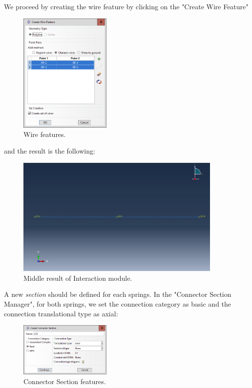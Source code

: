We proceed by creating the wire feature by clicking on the "Create Wire Feature" 
\begin{figure}[H]
    \centering
    \includegraphics[width=0.4\textwidth]{Images/ab1/a4.png}
    \caption{Wire features.}
    \label{fig:a4}
\end{figure}

and the result is the following:
\begin{figure}[H]
    \centering
    \includegraphics[width=0.9\textwidth]{Images/ab1/a5.png}
    \caption{Middle result of Interaction module.}
    \label{fig:a5}
\end{figure}

\newpage

A new \emph{section} should be defined for each springs. In the "Connector Section Manager", for both springs, we set the connection category as basic and the connection translational type as axial:
\begin{figure}[H]
    \centering
    \includegraphics[width=0.4\textwidth]{Images/ab1/a7.png}
    \caption{Connector Section features.}
    \label{fig:a7}
\end{figure}

